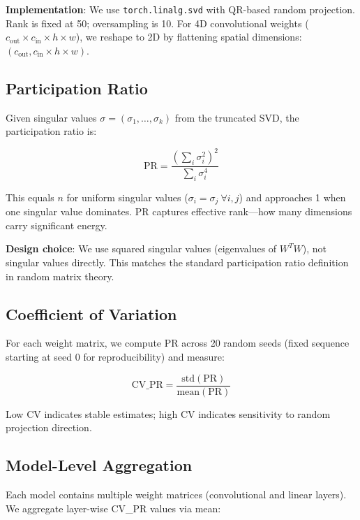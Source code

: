 \textbf{Implementation}: We use \texttt{torch.linalg.svd} with QR-based random projection. Rank is fixed at 50; oversampling is 10. For 4D convolutional weights ($c_\text{out} \times c_\text{in} \times h \times w$), we reshape to 2D by flattening spatial dimensions: $(c_\text{out}, c_\text{in} \times h \times w)$.

\subsection{Participation Ratio}

Given singular values $\sigma = (\sigma_1, \ldots, \sigma_k)$ from the truncated SVD, the participation ratio is:

\begin{equation}
\text{PR} = \frac{(\sum_i \sigma_i^2)^2}{\sum_i \sigma_i^4}
\end{equation}

This equals $n$ for uniform singular values ($\sigma_i = \sigma_j\ \forall i,j$) and approaches 1 when one singular value dominates. PR captures effective rank---how many dimensions carry significant energy.

\textbf{Design choice}: We use squared singular values (eigenvalues of $W^T W$), not singular values directly. This matches the standard participation ratio definition in random matrix theory.

\subsection{Coefficient of Variation}

For each weight matrix, we compute PR across 20 random seeds (fixed sequence starting at seed 0 for reproducibility) and measure:

\begin{equation}
\text{CV\_PR} = \frac{\text{std}(\text{PR})}{\text{mean}(\text{PR})}
\end{equation}

Low CV indicates stable estimates; high CV indicates sensitivity to random projection direction.

\subsection{Model-Level Aggregation}

Each model contains multiple weight matrices (convolutional and linear layers). We aggregate layer-wise CV\_PR values via mean:

